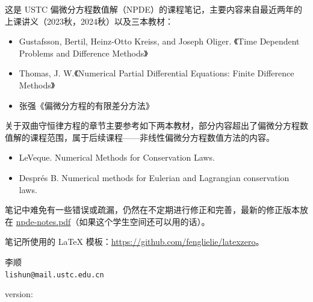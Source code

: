 这是 USTC 偏微分方程数值解（NPDE）的课程笔记，主要内容来自最近两年的上课讲义（2023秋，2024秋）以及三本教材：
\begin{itemize}
    \item Gustafsson, Bertil, Heinz-Otto Kreiss, and Joseph Oliger. 《Time Dependent Problems and Difference Methods》
    \item Thomas, J. W.《Numerical Partial Differential Equations: Finite Difference Methods》
    \item 张强《偏微分方程的有限差分方法》
\end{itemize}
关于双曲守恒律方程的章节主要参考如下两本教材，部分内容超出了偏微分方程数值解的课程范围，属于后续课程——非线性偏微分方程数值方法的内容。
\begin{itemize}
    \item LeVeque. Numerical Methods for Conservation Laws.
    \item Després B. Numerical methods for Eulerian and Lagrangian conservation laws.
\end{itemize}
笔记中难免有一些错误或疏漏，仍然在不定期进行修正和完善，最新的修正版本放在 \href{http://home.ustc.edu.cn/~lishun/npde-notes.pdf}{npde-notes.pdf}（如果这个学生空间还可以用的话）。

笔记所使用的 \LaTeX{} 模板：\href{https://github.com/fenglielie/latexzero}{https://github.com/fenglielie/latexzero}。

\begin{flushright}
    李顺\\
    \texttt{lishun@mail.ustc.edu.cn}
\end{flushright}


\vfill
\begin{center}
    version: 
\end{center}
